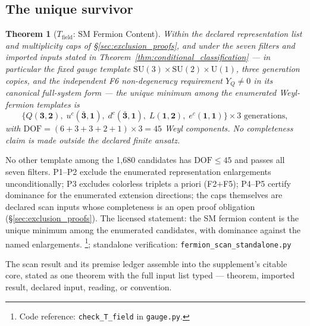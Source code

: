 \documentclass[11pt]{article}
\newtheorem{theorem}{Theorem}[section]
\theoremstyle{definition}
\newcommand{\SU}{\mathrm{SU}}
\newcommand{\U}{\mathrm{U}}
\newcommand{\coderef}[2]{\footnote{Code reference: \texttt{#1} in \texttt{#2}.}}
\begin{document}
\subsection{The unique survivor}
\label{sec:unique_survivor}

\begin{theorem}[$T_{\mathrm{field}}$: SM Fermion Content]\label{thm:Tfield}
Within the declared representation list and multiplicity caps of
\S\ref{sec:exclusion_proofs}, and under the seven filters and imported
inputs stated in Theorem~\ref{thm:conditional_classification} --- in
particular the fixed gauge template
$\SU(3)\times\SU(2)\times\U(1)$, three generation copies, and the
independent F6 non-degeneracy requirement $Y_Q\neq0$ in its canonical
full-system form --- the unique minimum among the enumerated
Weyl-fermion templates is
\[
  \{Q(\mathbf{3},\mathbf{2}),\;
    u^c(\bar{\mathbf{3}},\mathbf{1}),\;
    d^c(\bar{\mathbf{3}},\mathbf{1}),\;
    L(\mathbf{1},\mathbf{2}),\;
    e^c(\mathbf{1},\mathbf{1})\}
  \times 3 \text{ generations},
\]
with $\mathrm{DOF}=(6+3+3+2+1)\times3=45$ Weyl components.
No completeness claim is made outside the declared finite ansatz.
\end{theorem}

\noindent No other template among the 1{,}680 candidates has
$\mathrm{DOF} \le 45$ and passes all seven filters.  P1--P2 exclude
the enumerated representation enlargements unconditionally; P3
excludes colorless triplets a priori (F2$+$F5); P4--P5 certify
dominance for the enumerated extension directions; the caps
themselves are declared scan inputs whose completeness is an open
proof obligation (\S\ref{sec:exclusion_proofs}).  The licensed
statement: the SM fermion content is the unique minimum among the
enumerated candidates, with dominance against the named enlargements.
\coderef{check\_T\_field}{gauge.py}; standalone verification: \texttt{fermion\_scan\_standalone.py}~\cite{BrookeFermionScan}

The scan result and its premise ledger assemble into the
supplement's citable core, stated as one theorem with the full input
list typed --- theorem, imported result, declared input, reading, or
convention.
\end{document}
